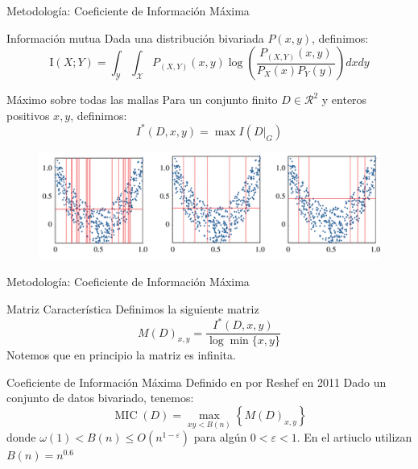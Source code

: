 \documentclass{beamer}
\begin{document}
\begin{frame}{Metodología: Coeficiente de Información Máxima}
    \pause
    
    \begin{block}{Información mutua}
    Dada una distribución bivariada $P(x,y)$, definimos:
        \begin{equation}\label{información mutua}
            \mathrm{I}(X ; Y)=\int_{\mathcal{Y}} \int_{\mathcal{X}} P_{(X, Y)}(x, y) \log \left(\frac{P_{(X, Y)}(x, y)}{P_{X}(x) P_{Y}(y)}\right)dxdy
        \end{equation}
    \end{block}
    \pause


    \begin{block}{Máximo sobre todas las mallas}
        Para un conjunto finito $D\in\mathcal{R}  ^2$ y enteros positivos $x,y$, definimos:
		$$
		I^*(D,x,y)=\max I(D|_G)
		$$
    \end{block}
    \begin{figure}
        \centering
        \includegraphics[scale=0.6] {rsos201424f03.png}
        \label{fig:my_label}
    \end{figure}
\end{frame}

\begin{frame}{Metodología: Coeficiente de Información Máxima}
    \begin{block}{Matriz Característica}
        Definimos la siguiente matriz       
        \begin{equation}
	    	M(D)_{x, y}=\frac{I^{*}(D, x, y)}{\log \min \{x, y\}}
        \end{equation}
        Notemos que en principio la matriz es infinita.
    \end{block}
    \pause

    \begin{block}{Coeficiente de Información Máxima}
        Definido en por Reshef en 2011 \cite{reshef2011} Dado un conjunto de datos bivariado, tenemos:
        \begin{equation}\label{MIC}
	    	\operatorname{MIC}(D)=\max _{x y<B(n)}\left\{M(D)_{x, y}\right\}
        \end{equation}
        donde $\omega(1)<B(n) \leq O\left(n^{1-\varepsilon}\right)$ para alg\'un $0<\varepsilon<1$. En el artiuclo utilizan $B(n)=n^{0.6}$
    \end{block}
\end{frame}
\end{document}
